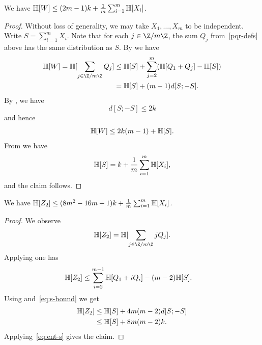 \begin{lemma}[Entropy of $W$]\label{ent-w}\leanok  We have $\mathbb{H}[W] \leq (2m-1)k + \frac1m \sum_{i=1}^m \mathbb{H}[X_i]$.
\end{lemma}

\begin{proof}\leanok Without loss of generality, we may take $X_1,\dots,X_m$ to be independent. Write $S = \sum_{i=1}^m X_i$.
  Note that for each $j \in \Z/m\Z$, the sum $Q_j$ from~\eqref{pqr-defs} above has the same distribution as $S$.
  By  we have
  \begin{align*}
    \bbH[W] = \bbH[\sum_{j \in \Z/m\Z} Q_j]  & \leq \bbH[S] + \sum_{j=2}^m (\bbH[Q_1+Q_j] - \bbH[S]) \\ & = \bbH[S] + (m-1) d[S;-S].
  \end{align*}
  By , we have
  \begin{equation}
    \label{eq:s-bound}
    d[S; -S] \leq 2 k
  \end{equation}
  and hence
  \[
    \mathbb{H}[W] \leq 2 k (m-1) + \mathbb{H}[S].
  \]
  From  we have
  \begin{equation}
    \label{eq:ent-s}
    \mathbb{H}[S] = k + \frac1m \sum_{i=1}^m \mathbb{H}[X_i],
  \end{equation}
  and the claim follows.
\end{proof}

\begin{lemma}[Entropy of $Z_2$]\label{ent-z2}\leanok  We have $\mathbb{H}[Z_2] \leq (8m^2-16m+1) k + \frac{1}{m} \sum_{i=1}^m \mathbb{H}[X_i]$.
\end{lemma}

\begin{proof}\leanok
  We observe
  \[
    \bbH[Z_2] = \bbH[\sum_{j \in \Z/m\Z} j Q_j].
  \]
  Applying  one has
  \begin{align*}
    \mathbb{H}[Z_2] &\leq \sum_{i=2}^{m-1} \mathbb{H}[Q_1 + i Q_i]  - (m-2) \mathbb{H}[S].
  \end{align*}
  Using  and~\eqref{eq:s-bound} we get
  \begin{align*}
    \mathbb{H}[Z_2]
              &\leq \mathbb{H}[S] + 4m (m-2) d[S;-S] \\
              &\leq \mathbb{H}[S] + 8m (m-2) k.
  \end{align*}
  Applying~\eqref{eq:ent-s} gives the claim.
\end{proof}

